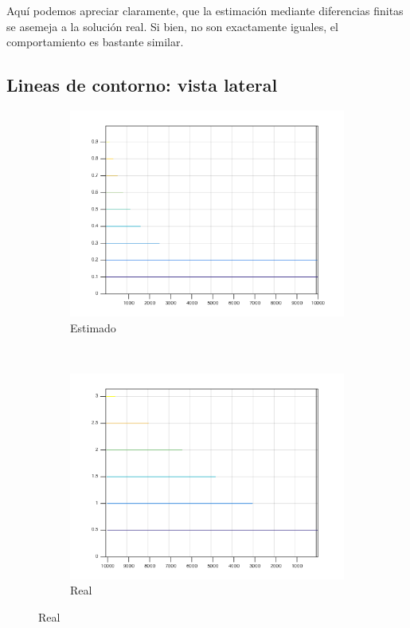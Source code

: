 \documentclass[12pt,letterpaper]{article}
\begin{document}
Aquí podemos apreciar claramente, que la estimación mediante diferencias finitas se asemeja a la solución real. Si bien, no son exactamente iguales, el comportamiento es bastante similar.

\subsection{Lineas de contorno: vista lateral}
\begin{figure}[!h]
        \centering
        \begin{subfigure}[h]{0.45\textwidth}
                \includegraphics[width=\textwidth]{estimado_lateral}
                \caption{Estimado}
                \label{fig:gull}
        \end{subfigure}
        ~
        \begin{subfigure}[h]{0.45\textwidth}
                \includegraphics[width=\textwidth]{real_lateral}
                \caption{Real}
                \label{fig:tiger}
        \end{subfigure}
\end{figure}
\end{document}
